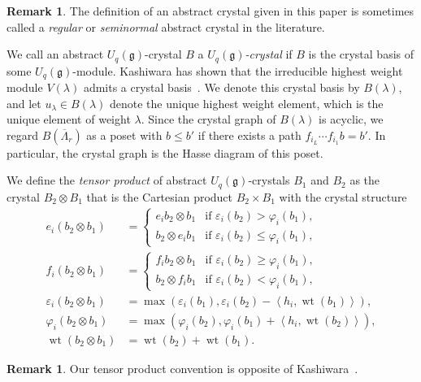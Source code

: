 \documentclass[reqno]{amsart}
\newcommand{\g}{\mathfrak{g}}
\newcommand{\clfw}{\overline{\Lambda}} %
\newcommand{\inner}[2]{\left\langle #1, #2 \right\rangle}
\DeclareMathOperator{\wt}{wt} %
\newcommand{\defn}[1]{{\color{darkred}\emph{#1}}} %
\theoremstyle{plain}
\theoremstyle{definition}
\newtheorem{remark}[thm]{Remark}
\numberwithin{equation}{section}
\begin{document}
\begin{remark}
The definition of an abstract crystal given in this paper is sometimes called a \defn{regular} or \defn{seminormal} abstract crystal in the literature.
\end{remark}

We call an abstract $U_q(\g)$-crystal $B$ a \defn{$U_q(\g)$-crystal} if $B$ is the crystal basis of some $U_q(\g)$-module.
Kashiwara has shown that the irreducible highest weight module $V(\lambda)$ admits a crystal basis~\cite{K91}.
We denote this crystal basis by $B(\lambda)$, and let $u_{\lambda} \in B(\lambda)$ denote the unique highest weight element, which is the unique element of weight $\lambda$.
Since the crystal graph of $B(\lambda)$ is acyclic, we regard $B(\clfw_r)$ as a poset with $b \leq b'$ if there exists a path $f_{i_L} \cdots f_{i_1} b = b'$.
In particular, the crystal graph is the Hasse diagram of this poset.

We define the \defn{tensor product} of abstract $U_q(\g)$-crystals $B_1$ and $B_2$ as the crystal $B_2 \otimes B_1$ that is the Cartesian product $B_2 \times B_1$ with the crystal structure
\begin{align*}
e_i(b_2 \otimes b_1) & = \begin{cases}
e_i b_2 \otimes b_1 & \text{if } \varepsilon_i(b_2) > \varphi_i(b_1), \\
b_2 \otimes e_i b_1 & \text{if } \varepsilon_i(b_2) \leq \varphi_i(b_1),
\end{cases}
\\ f_i(b_2 \otimes b_1) & = \begin{cases}
f_i b_2 \otimes b_1 & \text{if } \varepsilon_i(b_2) \geq \varphi_i(b_1), \\
b_2 \otimes f_i b_1 & \text{if } \varepsilon_i(b_2) < \varphi_i(b_1),
\end{cases}
\\ \varepsilon_i(b_2 \otimes b_1) & = \max(\varepsilon_i(b_1), \varepsilon_i(b_2) - \inner{h_i}{\wt(b_1)}),
\\ \varphi_i(b_2 \otimes b_1) & = \max(\varphi_i(b_2), \varphi_i(b_1) + \inner{h_i}{\wt(b_2)}),
\\ \wt(b_2 \otimes b_1) & = \wt(b_2) + \wt(b_1).
\end{align*}

\begin{remark}
Our tensor product convention is opposite of Kashiwara~\cite{K91}.
\end{remark}
\end{document}
